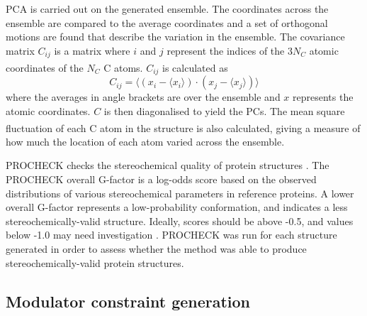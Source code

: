 PCA is carried out on the generated ensemble.
The coordinates across the ensemble are compared to the average coordinates and a set of orthogonal motions are found that describe the variation in the ensemble.
The covariance matrix $C_{ij}$ is a matrix where $i$ and $j$ represent the indices of the $3 N_{C}$ atomic coordinates of the $N_{C}$ C\textsuperscript{\textalpha} atoms.
$C_{ij}$ is calculated as
$$
C_{ij} = \langle (x_{i} - \langle x_{i} \rangle) \cdot (x_{j} - \langle x_{j} \rangle) \rangle
$$
where the averages in angle brackets are over the ensemble and $x$ represents the atomic coordinates.
$C$ is then diagonalised to yield the PCs.
The mean square fluctuation of each C\textsuperscript{\textalpha} atom in the structure is also calculated, giving a measure of how much the location of each atom varied across the ensemble.

PROCHECK checks the stereochemical quality of protein structures \cite{Laskowski1993}.
The PROCHECK overall G-factor is a log-odds score based on the observed distributions of various stereochemical parameters in reference proteins.
A lower overall G-factor represents a low-probability conformation, and indicates a less stereochemically-valid structure.
Ideally, scores should be above -0.5, and values below -1.0 may need investigation \cite{Esposito2006}.
PROCHECK was run for each structure generated in order to assess whether the method was able to produce stereochemically-valid protein structures.


\subsection{Modulator constraint generation}

